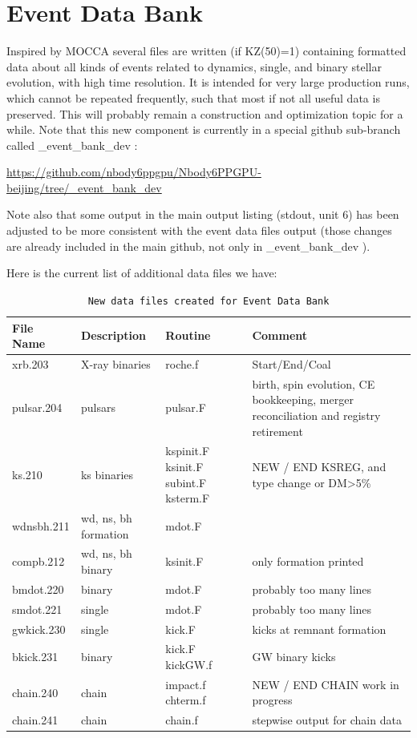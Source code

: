 \section{Event Data Bank}

Inspired by MOCCA several files are written (if KZ(50)=1) containing formatted data about all kinds of events related to dynamics, single, and binary stellar evolution, with high time resolution. It is intended for very large production runs, which cannot be repeated frequently, such that most if not all useful data is preserved. This will probably remain a construction and optimization topic for a while. Note that this new component is currently in a special github sub-branch called \_event\_bank\_dev :
\bigskip\noindent

\noindent\url{https://github.com/nbody6ppgpu/Nbody6PPGPU-beijing/tree/_event_bank_dev}
\bigskip\noindent

\noindent Note also that some output in the main output listing (stdout, unit 6) has been adjusted to be more consistent with the event data files output (those changes are already included in the main github, not only in \_event\_bank\_dev ).
\bigskip

\noindent Here is the current list of additional data files we have:

\begin{longtable}{@{}p{1.5cm} p{3.0cm} p{3.0cm} p{5.0cm}}
\caption{\texttt{New data files created for Event Data Bank}}
\label{table:ininput1}\\\hline
File Name & Description & Routine & Comment \\\hline
%
xrb.203  & X-ray binaries & roche.f & Start/End/Coal \\
pulsar.204 & pulsars & pulsar.F & birth, spin evolution, CE bookkeeping, merger reconciliation and registry retirement \\
ks.210 & ks binaries & kspinit.F ksinit.F subint.F ksterm.F & NEW / END KSREG, and type change or DM>5\% \\
wdnsbh.211 & wd, ns, bh formation & mdot.F & \\
compb.212 & wd, ns, bh binary & ksinit.F & only formation printed \\
bmdot.220 & binary    & mdot.F & probably too many lines \\
smdot.221 & single    & mdot.F & probably too many lines \\
gwkick.230 & single    & kick.F & kicks at remnant formation \\
bkick.231 & binary    & kick.F kickGW.f & GW binary kicks \\
chain.240 & chain     &  impact.f chterm.f & NEW / END CHAIN work in progress \\
chain.241 & chain     & chain.f & stepwise output for chain data \\
\hline

\end{longtable}

